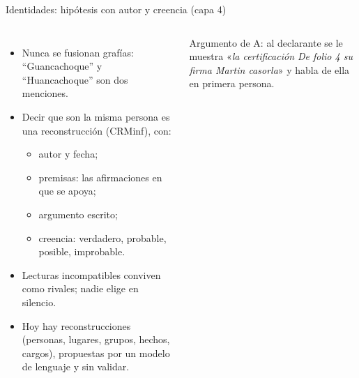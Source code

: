 \documentclass[aspectratio=169,10pt]{beamer}
\newcommand{\cita}[1]{«\textit{#1}»}
\begin{document}
\begin{frame}{Identidades: hipótesis con autor y creencia (capa 4)}
\begin{columns}[T]
\small
\begin{itemize}
\item Nunca se fusionan grafías: \enquote{Guancachoque} y \enquote{Huancachoque} son dos menciones.
\item Decir que son la misma persona es una \alert{reconstrucción} (CRMinf), con:
  \begin{itemize}\footnotesize
  \item autor y fecha;
  \item premisas: las afirmaciones en que se apoya;
  \item argumento escrito;
  \item creencia: verdadero, probable, posible, improbable.
  \end{itemize}
\item Lecturas incompatibles conviven como \alert{rivales}; nadie elige en silencio.
\item Hoy hay \cifraReconstrucciones{} reconstrucciones (personas, lugares, grupos, hechos, cargos), propuestas por un
      modelo de lenguaje y \alert{sin validar}.
\end{itemize}
\centering
{}

\medskip
\scriptsize Argumento de A: al declarante se le muestra \cita{la certificación De folio 4 su firma Martin casorla} y
habla de ella en primera persona.
\end{columns}
\end{frame}
\end{document}
